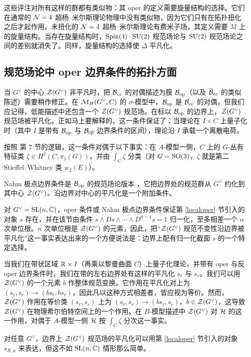 这些评注对所有这样的群都有类似物：其 oper 的定义需要旋量结构的选择。它们在通常的 ${\mathcal N}=4$ 超杨–米尔斯理论物理中没有类似物，因为它们只有在拓扑扭化之后才起作用。未扭化的 ${\mathcal N}=4$ 超杨–米尔斯理论有费米子场，其定义需要 $M$ 上的旋量结构。当存在旋量结构时，${\mathrm{Spin}}(4)\cdot {\mathrm{SU}}(2)$ 规范场论与 ${\mathrm{SU}}(2)$ 规范场论之间的差别就消失了。同样，旋量结构的选择使 $\Delta$ 平凡化。

\subsection{规范场论中 oper 边界条件的拓扑方面}\label{opergauge}

当 $G^\vee$ 的中心 ${\mathcal Z}(G^\vee)$ 非平凡时，把 ${\mathcal B}_{\mathrm{cc}}$ 的对偶描述为膜 ${\mathcal B}_{\mathrm{op}}$（以及 $\overline{{\mathcal B}}_{\mathrm{cc}}$ 的类似陈述）需要稍作修正。在 ${\mathcal M}_H(G^\vee,C)$ 的 $\sigma$-模型中，${\mathcal B}_{\mathrm{op}}$ 是 ${\mathcal B}_{\mathrm{cc}}$ 的对偶，但我们应记得，低能描述中还包含一个 ${\mathcal Z}(G^\vee)$ 规范场。在标以 ${\mathcal B}_{\mathrm{op}}$ 的边界上，${\mathcal Z}(G^\vee)$ 规范场被平凡化。正如马上要解释的，这一条件保证了：当理论在 $I\times C$ 上量子化时（其中 $I$ 是带有 ${\mathcal B}_{\mathrm{op}}$ 与 ${\mathcal B}_{\overline{\mathrm{op}}}$ 边界条件的区间），理论沿 $I$ 承载一个离散电荷。

按照 \cite{KW} 第 7 节的逻辑，这一条件对偶于以下事实：在 $A$-模型一侧，$C$ 上的 $G$-丛有特征类 $\zeta \in H^2(C,\pi_1(G))$，并由 $\int_C\zeta$ 分类（对 $G={\mathrm{SO}}(3)$，$\zeta$ 就是第二 Stieffel–Whitney 类 $w_2(E)$）。

Nahm 极点边界条件是 ${\mathcal B}_{\mathrm{op}}$ 的规范场论版本 \cite{GWknots}，它把边界处的规范群从 $G^\vee$ 约化到其中心 ${\mathcal Z}(G^\vee)$。沿边界对中心的平凡化是一个附加条件。

对 $G^\vee={\mathrm{SL}}(n,{\mathbb C})$，oper 条件或 Nahm 极点边界条件保证第 \ref{localoper} 节引入的对象 $s$ 存在，并在该节由条件 $s\wedge Ds \wedge \cdots \wedge D^{n-1}s=1$ 归一化，至多相差一个 $n$ 次单位根。$n$ 次单位根是 ${\mathcal Z}(G^\vee)$ 的元素，因此，把“${\mathcal Z}(G^\vee)$ 规范不变性沿边界被平凡化”这一事实表达出来的一个方便说法是：边界上配有归一化截面 $s$ 的一个特定选择。

当我们在带状区域 ${\mathbb R}\times I$（再乘以黎曼曲面 $C$）上量子化理论，并带有 oper 与反 oper 边界条件时，我们在带的左右边界处有这样的平凡化 $s_\ell$ 与 $s_r$。我们可以用 ${\mathcal Z}(G^\vee)$ 的一个元素 $b$ 作整体规范变换。它作用在平凡化对上为 $(s_\ell,s_r)\to (b s_\ell, b s_r)$，因此凡以这种方式相差者，皆应视为等价。然而，${\mathcal Z}(G^\vee)$ 作用在等价类 $(s_\ell,s_r)$ 上为 $(s_\ell,s_r)\to (b s_\ell,s_r)$，$b\in {\mathcal Z}(G^\vee)$，这导致 ${\mathcal Z}(G^\vee)$ 在物理希尔伯特空间上的一个作用。在 $B$-模型描述中 ${\mathcal Z}(G^\vee)$ 对 ${\mathcal H}$ 的这一作用，对偶于 $A$-模型一侧 ${\mathcal H}$ 按 $\int_C \zeta$ 分次这一事实。

对任意 $G^\vee$，边界上 ${\mathcal Z}(G^\vee)$ 规范场的平凡化可以用第 \ref{localoper} 节引入的对象 $s_{R,n}$ 来表达，但这不如 ${\mathrm{SL}}(n,{\mathbb C})$ 情形那么简单。
